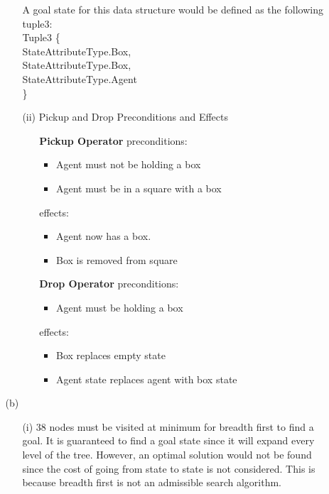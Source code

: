 \begin{enumerate}
\begin{enumerate}
\begin{enumerate}
						A goal state for this data structure would be defined as the following tuple3: \\
					
						Tuple3 \{ \\
						\hspace*{4mm} StateAttributeType.Box, \\
						\hspace*{4mm} StateAttributeType.Box, \\
						\hspace*{4mm} StateAttributeType.Agent \\
						\} \\
						
					\item[(ii)] Pickup and Drop Preconditions and Effects
					\begin{enumerate}
						\item[\bf Pickup Operator] 
							preconditions:
							\begin{itemize}
								\item{Agent must not be holding a box}
								\item{Agent must be in a square with a box}
							\end{itemize}
							effects:
							\begin{itemize}
								\item{Agent now has a box.}
								\item{Box is removed from square}
							\end{itemize}
						\item[\bf Drop Operator]
							preconditions:
							\begin{itemize}
								\item{Agent must be holding a box}
							\end{itemize}
							effects:
							\begin{itemize}
								\item{Box replaces empty state}
								\item{Agent state replaces agent with box state}
							\end{itemize}
					\end{enumerate}
					
				\end{enumerate}
			\item[(b)]
				\begin{enumerate}
					\item[(i)] 38 nodes must be visited at minimum for breadth first to find a goal.  It is guaranteed to find a goal state since it will expand every level of the tree.  However, an optimal solution would not be found since the cost of going from state to state is not considered.  This is because breadth first is not an admissible search algorithm.
					

\end{enumerate}
\end{enumerate}
\end{enumerate}
